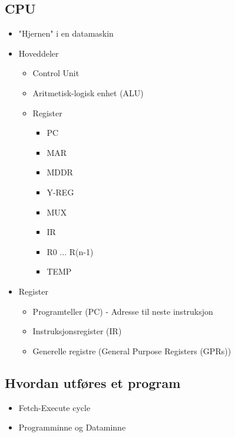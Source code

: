 \documentclass{article}
\begin{document}
		\subsection{CPU}
			\begin{itemize}
				\item "Hjernen" i en datamaskin
				\item Hoveddeler
					\begin{itemize}
						\item Control Unit
						\item Aritmetisk-logisk enhet (ALU)
						\item Register
							\begin{itemize}
								\item PC
								\item MAR
								\item MDDR
								\item Y-REG
								\item MUX
								\item IR
								\item R0 ... R(n-1)
								\item TEMP
							\end{itemize}
					\end{itemize}
				\item Register
					\begin{itemize}
						\item Programteller (PC) - Adresse til neste instruksjon
						\item Instruksjonsregister (IR)
						\item Generelle registre (General Purpose Registers (GPRs))
					\end{itemize}
			\end{itemize}
		\subsection{Hvordan utføres et program}
			\begin{itemize}
				\item Fetch-Execute cycle
				\item Programminne og Dataminne
			\end{itemize}
\end{document}
